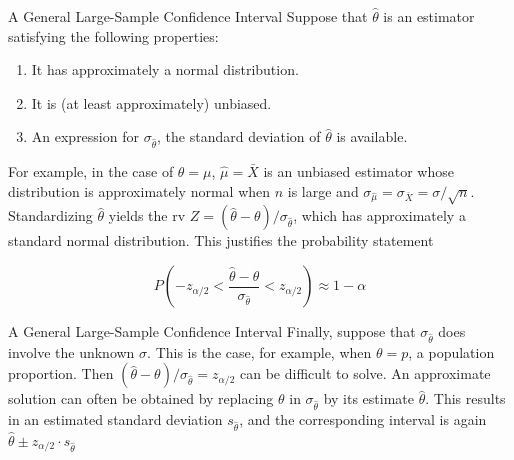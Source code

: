 \documentclass[
  ignorenonframetext,
]{beamer}
\providecommand{\tightlist}{%
  \setlength{\itemsep}{0pt}\setlength{\parskip}{0pt}}\usepackage{longtable,booktabs,array}
\begin{document}
\begin{frame}{A General Large-Sample Confidence Interval}
\protect\hypertarget{a-general-large-sample-confidence-interval}{}
Suppose that \(\hat{\theta}\) is an estimator satisfying the following
properties:

\begin{enumerate}[<+->]
\tightlist
\item
  It has approximately a normal distribution.
\item
  It is (at least approximately) unbiased.
\item
  An expression for \(\sigma_{\hat{\theta}}\), the standard deviation of
  \(\hat{\theta}\) is available.
\end{enumerate}

For example, in the case of \(\theta = \mu\), \(\hat{\mu} = \bar{X}\) is
an unbiased estimator whose distribution is approximately normal when
\(n\) is large and
\(\sigma_{\hat{\mu}} = \sigma_{\bar{X}} = \sigma/\sqrt{n}\).
Standardizing \(\hat{\theta}\) yields the rv
\(Z = (\hat{\theta} - \theta)/\sigma_{\hat{\theta}}\), which has
approximately a standard normal distribution. This justifies the
probability statement

\[
P\left(-z_{\alpha/2} < \frac{\hat{\theta} - \theta}{\sigma_{\hat{\theta}}} < z_{\alpha/2}\right) \approx 1 - \alpha
\]
\end{frame}

\begin{frame}{A General Large-Sample Confidence Interval}
\protect\hypertarget{a-general-large-sample-confidence-interval-1}{}
Finally, suppose that \(\sigma_{\hat{\theta}}\) does involve the unknown
\(\sigma\). This is the case, for example, when \(\theta=p\), a
population proportion. Then
\((\hat{\theta} - \theta)/\sigma_{\hat{\theta}} = z_{\alpha/2}\) can be
difficult to solve. An approximate solution can often be obtained by
replacing \(\theta\) in \(\sigma_{\hat{\theta}}\) by its estimate
\(\hat{\theta}\). This results in an estimated standard deviation
\(s_{\hat{\theta}}\), and the corresponding interval is again
\(\hat{\theta} \pm z_{\alpha/2}\cdot s_{\hat{\theta}}\)
\end{frame}
\end{document}
